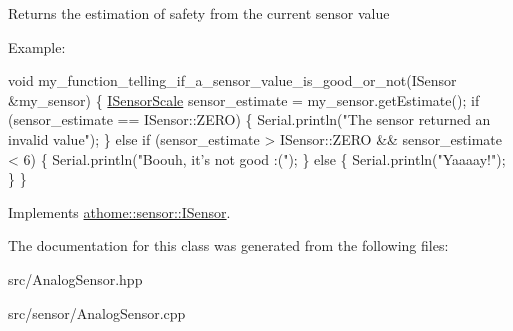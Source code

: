 Returns the estimation of safety from the current sensor value

Example\+:


\begin{DoxyCode}
\textcolor{keywordtype}{void} my\_function\_telling\_if\_a\_sensor\_value\_is\_good\_or\_not(ISensor &my\_sensor) \{
  \mbox{\hyperlink{classathome_1_1sensor_1_1_i_sensor_aa70bc27a4c17c86caf96cca776541ddf}{ISensorScale}} sensor\_estimate = my\_sensor.getEstimate();
  \textcolor{keywordflow}{if} (sensor\_estimate == ISensor::ZERO) \{
    Serial.println(\textcolor{stringliteral}{"The sensor returned an invalid value"});
  \}
  \textcolor{keywordflow}{else} \textcolor{keywordflow}{if} (sensor\_estimate > ISensor::ZERO && sensor\_estimate < 6) \{
    Serial.println(\textcolor{stringliteral}{"Boouh, it's not good :("});
  \}
  \textcolor{keywordflow}{else} \{
    Serial.println(\textcolor{stringliteral}{"Yaaaay!"});
  \}
\}
\end{DoxyCode}
 

Implements \mbox{\hyperlink{classathome_1_1sensor_1_1_i_sensor_af86df8538fecfcfc670b4adfbbde6abb}{athome\+::sensor\+::\+I\+Sensor}}.



The documentation for this class was generated from the following files\+:\begin{DoxyCompactItemize}
\item 
src/Analog\+Sensor.\+hpp\item 
src/sensor/Analog\+Sensor.\+cpp\end{DoxyCompactItemize}
